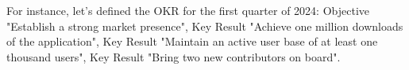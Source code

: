 \noindent For instance, let's defined the OKR for the first quarter of 2024: Objective "Establish a strong market 
presence", Key Result "Achieve one million downloads of the application", Key Result "Maintain an active user base of 
at least one thousand users", Key Result "Bring two new contributors on board".
